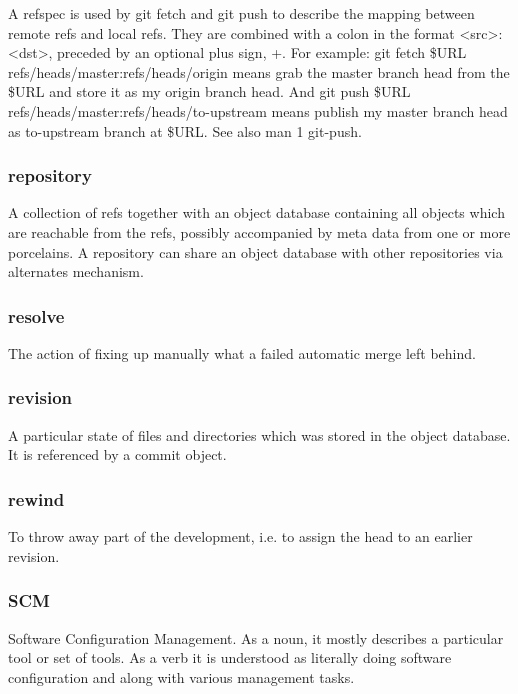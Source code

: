 A refspec is used by git fetch and git push to describe the mapping between remote refs and local refs. They are combined with a colon in the format <src>:<dst>, preceded by an optional plus sign, +. For example: git fetch \$URL refs/heads/master:refs/heads/origin means grab the master branch head from the \$URL and store it as my origin branch head. And git push \$URL refs/heads/master:refs/heads/to-upstream means publish my master branch head as to-upstream branch at \$URL. See also man 1 git-push.

\subsubsection{repository}

A collection of refs together with an object database containing all objects which are reachable from the refs, possibly accompanied by meta data from one or more porcelains. A repository can share an object database with other repositories via alternates mechanism.

\subsubsection{resolve}

The action of fixing up manually what a failed automatic merge left behind.

\subsubsection{revision}

A particular state of files and directories which was stored in the object database. It is referenced by a commit object.

\subsubsection{rewind}

To throw away part of the development, i.e. to assign the head to an earlier revision.

\subsubsection{SCM}

Software Configuration Management. As a noun, it mostly describes a particular tool or set of tools. As a verb it is understood as literally doing software configuration and along with various management tasks.

